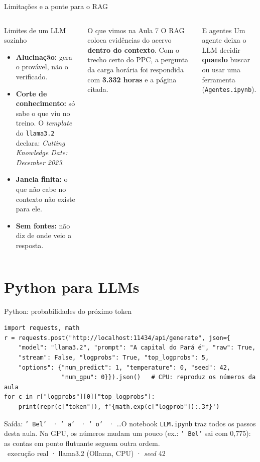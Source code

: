 \documentclass[aspectratio=169]{beamer}
\newcommand{\real}{\textcolor{minegreen}{\tiny\faIcon{flask}\ execução real · llama3.2 (Ollama, CPU) · \textit{seed} 42}}
\begin{document}
\begin{frame}{Limitações e a ponte para o RAG}
    \begin{columns}
        \begin{alertblock}{Limites de um LLM sozinho}
            \begin{itemize}\footnotesize
                \item \textbf{Alucinação:} gera o provável, não o verificado.
                \item \textbf{Corte de conhecimento:} só sabe o que viu no treino. O \textit{template} do \texttt{llama3.2} declara: \textit{Cutting Knowledge Date: December 2023}.
                \item \textbf{Janela finita:} o que não cabe no contexto não existe para ele.
                \item \textbf{Sem fontes:} não diz de onde veio a resposta.
            \end{itemize}
        \end{alertblock}
        \pause
        \begin{block}{O que vimos na Aula 7}
            \footnotesize O RAG coloca evidências do acervo \textbf{dentro do contexto}. Com o trecho certo do PPC, a pergunta da carga horária foi respondida com \textbf{3.332 horas} e a página citada.
        \end{block}
        \begin{block}{E agentes}
            \footnotesize Um agente deixa o LLM decidir \textbf{quando} buscar ou usar uma ferramenta (\texttt{Agentes.ipynb}).
        \end{block}
    \end{columns}
\end{frame}

\section{Python para LLMs}
\begin{frame}[fragile]{Python: probabilidades do próximo token}
\begin{lstlisting}
import requests, math
r = requests.post("http://localhost:11434/api/generate", json={
    "model": "llama3.2", "prompt": "A capital do Pará é", "raw": True,
    "stream": False, "logprobs": True, "top_logprobs": 5,
    "options": {"num_predict": 1, "temperature": 0, "seed": 42,
                "num_gpu": 0}}).json()   # CPU: reproduz os números da aula
for c in r["logprobs"][0]["top_logprobs"]:
    print(repr(c["token"]), f'{math.exp(c["logprob"]):.3f}')
\end{lstlisting}
    \footnotesize Saída: \texttt{' Bel' \vBELd} · \texttt{' a' \vAd} · \texttt{' o' \vOd} · \dots\quad O notebook \texttt{LLM.ipynb} traz todos os passos desta aula. Na GPU, os números mudam um pouco (ex.: \texttt{' Bel'} sai com 0,775): as contas em ponto flutuante seguem outra ordem.\\
    \real
\end{frame}
\end{document}
